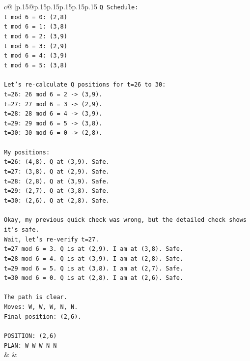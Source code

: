 \documentclass{article}
\begin{document}
{\begin{supertabular}{c@{$\;$}|p{.15\linewidth}@{}p{.15\linewidth}p{.15\linewidth}p{.15\linewidth}p{.15\linewidth}p{.15\linewidth}}
{{{\texttt{Q Schedule:} \\
\texttt{t mod 6 = 0: (2,8)} \\
\texttt{t mod 6 = 1: (3,8)} \\
\texttt{t mod 6 = 2: (3,9)} \\
\texttt{t mod 6 = 3: (2,9)} \\
\texttt{t mod 6 = 4: (3,9)} \\
\texttt{t mod 6 = 5: (3,8)} \\
\\ 
\texttt{Let's re{-}calculate Q positions for t=26 to 30:} \\
\texttt{t=26: 26 mod 6 = 2 {-}> (3,9).} \\
\texttt{t=27: 27 mod 6 = 3 {-}> (2,9).} \\
\texttt{t=28: 28 mod 6 = 4 {-}> (3,9).} \\
\texttt{t=29: 29 mod 6 = 5 {-}> (3,8).} \\
\texttt{t=30: 30 mod 6 = 0 {-}> (2,8).} \\
\\ 
\texttt{My positions:} \\
\texttt{t=26: (4,8). Q at (3,9). Safe.} \\
\texttt{t=27: (3,8). Q at (2,9). Safe.} \\
\texttt{t=28: (2,8). Q at (3,9). Safe.} \\
\texttt{t=29: (2,7). Q at (3,8). Safe.} \\
\texttt{t=30: (2,6). Q at (2,8). Safe.} \\
\\ 
\texttt{Okay, my previous quick check was wrong, but the detailed check shows it's safe.} \\
\texttt{Wait, let's re{-}verify t=27.} \\
\texttt{t=27 mod 6 = 3. Q is at (2,9). I am at (3,8). Safe.} \\
\texttt{t=28 mod 6 = 4. Q is at (3,9). I am at (2,8). Safe.} \\
\texttt{t=29 mod 6 = 5. Q is at (3,8). I am at (2,7). Safe.} \\
\texttt{t=30 mod 6 = 0. Q is at (2,8). I am at (2,6). Safe.} \\
\\ 
\texttt{The path is clear.} \\
\texttt{Moves: W, W, W, N, N.} \\
\texttt{Final position: (2,6).} \\
\\ 
\texttt{POSITION: (2,6)} \\
\texttt{PLAN: W W W N N} \\
            }
        }
    }
    & & \\ \\


\end{supertabular}}
\end{document}
